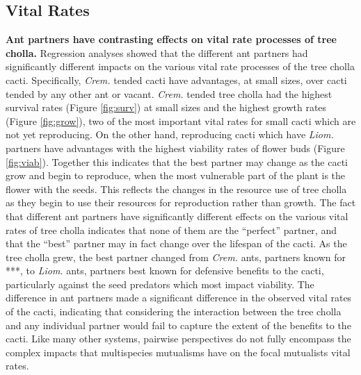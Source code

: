 \documentclass[12pt,a4paper]{article}
\begin{document}
		\subsection*{Vital Rates}
		\textbf{Ant partners have contrasting effects on vital rate processes of tree cholla.}
		Regression analyses showed that the different ant partners had significantly different impacts on the various vital rate processes of the tree cholla cacti. 
		Specifically, \textit{Crem.} tended cacti have advantages, at small sizes, over cacti tended by any other ant or vacant. 
		\textit{Crem.} tended tree cholla had the highest survival rates (Figure \ref{fig:surv})  at small sizes and the highest growth rates (Figure \ref{fig:grow}), two of the most important vital rates for small cacti which are not yet reproducing. 
		On the other hand, reproducing cacti which have \textit{Liom.} partners  have advantages with the highest viability rates of flower buds (Figure \ref{fig:viab}). 
		Together this indicates that the best partner may change as the cacti grow and begin to reproduce, when the most vulnerable part of the plant is the flower with the seeds. 
		This reflects the changes in the resource use of tree cholla as they begin to use their resources for reproduction rather than growth. 
		The fact that different ant partners have significantly different effects on the various vital rates of tree cholla indicates that none of them are the “perfect” partner, and that the “best” partner may in fact change over the lifespan of the cacti. 
		As the tree cholla grew, the best partner changed from \textit{Crem.} ants, partners known for ***, to \textit{Liom.} ants, partners best known for defensive benefits to the cacti, particularly against the seed predators which most impact viability. 
		The difference in ant partners made a significant difference in the observed vital rates of the cacti, indicating that considering the interaction between the tree cholla and any individual partner would fail to capture the extent of the benefits to the cacti.
		Like many other systems, pairwise perspectives do not fully encompass the complex impacts that multispecies mutualisms have on the focal mutualists vital rates.
		
\end{document}
